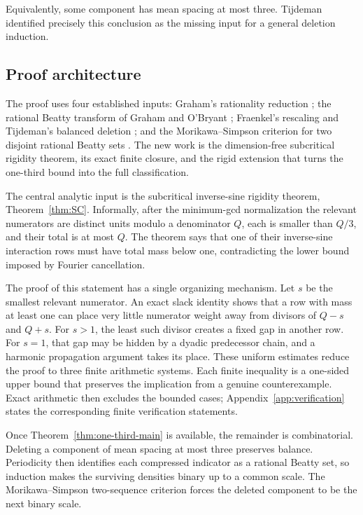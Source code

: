 \documentclass[11pt]{article}
\theoremstyle{definition}
\theoremstyle{remark}
\begin{document}
Equivalently, some component has mean spacing at most three.  Tijdeman
identified precisely this conclusion as the missing input for a general
deletion induction.

\subsection{Proof architecture}

The proof uses four established inputs: Graham's rationality reduction
\cite{Graham1973}; the rational Beatty transform of Graham and O'Bryant
\cite[Theorem~1.1]{GrahamOBryant2005}; Fraenkel's rescaling
\cite[Lemma~6]{Fraenkel1973} and Tijdeman's balanced deletion
\cite{TijdemanBalanced2000}; and the Morikawa--Simpson criterion for two
disjoint rational Beatty sets
\cite{Morikawa1985,Simpson2004}.  The new work is the dimension-free
subcritical rigidity theorem, its exact finite closure, and the rigid
extension that turns the one-third bound into the full classification.

The central analytic input is the subcritical inverse-sine rigidity theorem,
Theorem~\ref{thm:SC}.  Informally, after the minimum-gcd normalization the
relevant numerators are distinct units modulo a denominator \(Q\), each is
smaller than \(Q/3\), and their total is at most \(Q\).  The theorem says that
one of their inverse-sine interaction rows must have total mass below one,
contradicting the lower bound imposed by Fourier cancellation.

The proof of this statement has a single organizing mechanism.  Let \(s\) be
the smallest relevant numerator.  An exact slack identity shows that a row
with mass at least one can place very little numerator weight away from
divisors of \(Q-s\) and \(Q+s\).  For \(s>1\), the least such divisor creates
a fixed gap in another row.  For \(s=1\), that gap may be hidden by a dyadic
predecessor chain, and a harmonic propagation argument takes its place.
These uniform estimates reduce the proof to three finite arithmetic systems.
Each finite inequality is a one-sided upper bound that preserves the
implication from a genuine counterexample.  Exact arithmetic then excludes
the bounded cases; Appendix~\ref{app:verification} states the corresponding
finite verification statements.

Once Theorem~\ref{thm:one-third-main} is available, the remainder is
combinatorial.  Deleting a component of mean spacing at most three preserves
balance.  Periodicity then identifies each compressed indicator as a rational
Beatty set, so induction makes the surviving densities binary up to a common
scale.  The Morikawa--Simpson two-sequence criterion forces the deleted
component to be the next binary scale.
\end{document}
